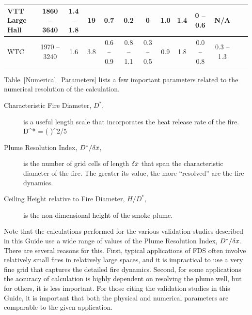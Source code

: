 \begin{table}
\begin{center}
\begin{tabular}{|l|c|c|c|c|c|c|c|c|c|c|c|c|}
VTT Large Hall      & 1860 -- 3640  & 1.4 -- 1.8    & 19    & 0.7               & 0.2                 & 0             & 1.0         & 1.4         & 0 -- 0.6              & N/A                   \\ \hline
WTC                 & 1970 -- 3240  & 1.6           & 3.8   & 0.6 -- 0.9        & 0.8 -- 1.1          & 0.3 -- 0.5    & 0.9         & 1.8         & 0.0 -- 0.8            & 0.3 -- 1.3              \\ \hline
\end{tabular}
\end{center}
\label{Test_Parameters}
\nopagebreak
\end{table}


\noindent
Table~\ref{Numerical_Parameters} lists a few important parameters related to the numerical resolution of the calculation.
\begin{description}
\item[Characteristic Fire Diameter, $D^*$,] is a useful length scale that incorporates the heat release rate of the fire.
\be D^* = \left(  \right)^{2/5}  \ee
\item[Plume Resolution Index, $D^*/\delta x$,] is the number of grid cells of length $\delta x$ that span the characteristic diameter of the fire. The greater its value, the more ``resolved'' are the fire dynamics.
\item[Ceiling Height relative to Fire Diameter, $H/D^*$,] is the non-dimensional height of the smoke plume.
\end{description}
Note that the calculations performed for the various validation studies described in this Guide use a wide range of values of the Plume Resolution Index, $D^*/\delta x$. There are several reasons for this. First, typical applications of FDS often involve relatively small fires in relatively large spaces, and it is impractical to use a very fine grid that captures the detailed fire dynamics. Second, for some applications the accuracy of calculation is highly dependent on resolving the plume well, but for others, it is less important. For those citing the validation studies in this Guide, it is important that both the physical and numerical parameters are comparable to the given application.


